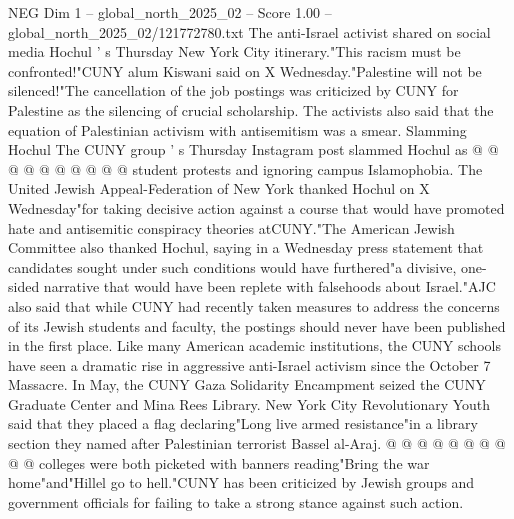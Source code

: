 \begin{textsample}{NEG Dim 1 – global\_north\_2025\_02 – Score 1.00 – global\_north\_2025\_02/121772780.txt}
The anti-Israel activist shared on social media Hochul ' s Thursday New York City itinerary."This racism must be confronted!"CUNY alum Kiswani said on X Wednesday."Palestine will not be silenced!"The cancellation of the job postings was criticized by CUNY for Palestine as the silencing of crucial scholarship.
The activists also said that the equation of Palestinian activism with antisemitism was a smear.
Slamming Hochul The CUNY group ' s Thursday Instagram post slammed Hochul as @ @ @ @ @ @ @ @ @ @ student protests and ignoring campus Islamophobia.
The United Jewish Appeal-Federation of New York thanked Hochul on X Wednesday"for taking decisive action against a course that would have promoted hate and antisemitic conspiracy theories atCUNY."The American Jewish Committee also thanked Hochul, saying in a Wednesday press statement that candidates sought under such conditions would have furthered"a divisive, one-sided narrative that would have been replete with falsehoods about Israel."AJC also said that while CUNY had recently taken measures to address the concerns of its Jewish students and faculty, the postings should never have been published in the first place.
Like many American academic institutions, the CUNY schools have seen a dramatic rise in aggressive anti-Israel activism since the October 7 Massacre.
In May, the CUNY Gaza Solidarity Encampment seized the CUNY Graduate Center and Mina Rees Library.
New York City Revolutionary Youth said that they placed a flag declaring"Long live armed resistance"in a library section they named after Palestinian terrorist Bassel al-Araj. @ @ @ @ @ @ @ @ @ @ colleges were both picketed with banners reading"Bring the war home"and"Hillel go to hell."CUNY has been criticized by Jewish groups and government officials for failing to take a strong stance against such action.

\end{textsample}
